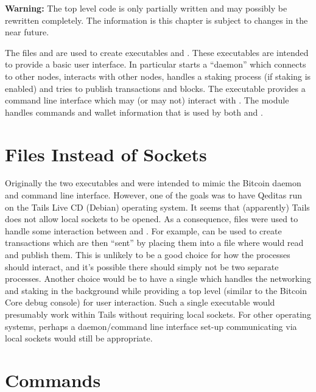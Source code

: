 {\bf{Warning:}} The top level code is only partially written and may possibly be rewritten completely.
The information is this chapter is subject to changes in the near future.

The files
{} and {}
are used to create executables
{} and {}.
These executables are intended to provide a basic user interface.
In particular {} starts a ``daemon''
which connects to other nodes, interacts with other nodes,
handles a staking process (if staking is enabled)
and tries to publish transactions and blocks.
The executable {} provides a command line interface
which may (or may not) interact with {}.
The module {} handles commands and wallet information
that is used by both {} and {}.

\section{Files Instead of Sockets}

Originally the
two executables {} and {}
were intended to mimic the Bitcoin daemon and command line interface.
However, one of the goals was to have Qeditas run on the Tails Live CD (Debian) operating system.
It seems that (apparently) Tails does not allow local sockets to be opened.
As a consequence, files were used to handle some interaction between {}
and {}. For example, {} can be used to create transactions
which are then ``sent'' by placing them into a file where {} would read
and publish them. This is unlikely to be a good choice for how the processes should interact,
and it's possible there should simply not be two separate processes.
Another choice would be to have a single {}
which handles the networking and staking in the background while providing a top level
(similar to the Bitcoin Core debug console) for user interaction.
Such a single executable would presumably work within Tails without requiring local sockets.
For other operating systems, perhaps a daemon/command line interface set-up communicating via
local sockets would still be appropriate.

\section{Commands}

